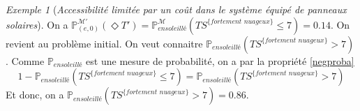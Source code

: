 \documentclass[12pt,a4paper]{report}
\theoremstyle{definition}%
\theoremstyle{remark}
\newtheorem{example}{Exemple}[chapter]
\newcommand{\ie}{i.e., }
\newcommand{\cf}{c.f. }
\newcommand{\pr}{\mathbb{P}}
\begin{document}
\begin{example}[\textit{Accessibilité limitée par un coût dans le système équipé de panneaux solaires}]
On a $\pr^{\mathcal{M'}}_{(e, 0)} (\Diamond T') = \pr^\mathcal{M}_{\textit{ensoleillé}}(TS^{\{ \textit{fortement nuageux} \}} \leq 7) = 0.14$. On revient au problème initial. On veut connaitre $\pr_{\textit{ensoleillé}}(TS^{\{ \textit{fortement nuageux} \}} > 7)$. Comme $\pr_{\textit{ensoleillé}}$ est une mesure de probabilité, on a par la propriété \ref{negproba} \[1 - \pr_{\textit{ensoleillé}}(TS^{\{ \textit{fortement nuageux} \}} \leq 7) = \pr_{\textit{ensoleillé}}(TS^{\{ \textit{fortement nuageux} \}} > 7)\]
Et donc, on a $\pr_{\textit{ensoleillé}}(TS^{\{ \textit{fortement nuageux} \}} > 7) = 0.86$.
\end{example}

%
%
%
\end{document}

